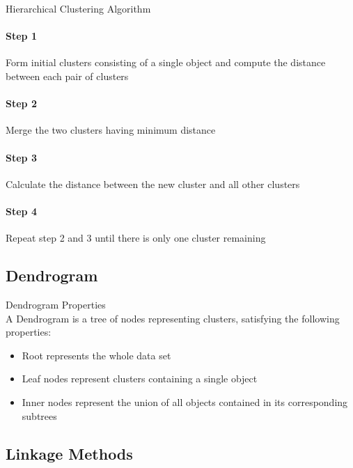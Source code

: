 \begin{KR}{Hierarchical Clustering Algorithm}\\
\paragraph{Step 1}
Form initial clusters consisting of a single object and compute the distance between each pair of clusters

\paragraph{Step 2}
Merge the two clusters having minimum distance

\paragraph{Step 3}
Calculate the distance between the new cluster and all other clusters

\paragraph{Step 4}
Repeat step 2 and 3 until there is only one cluster remaining
\end{KR}

\subsection{Dendrogram}

\begin{definition}{Dendrogram Properties}\\
A Dendrogram is a tree of nodes representing clusters, satisfying the following properties:
\begin{itemize}
    \item Root represents the whole data set
    \item Leaf nodes represent clusters containing a single object
    \item Inner nodes represent the union of all objects contained in its corresponding subtrees
\end{itemize}
\end{definition}


\subsection{Linkage Methods}

